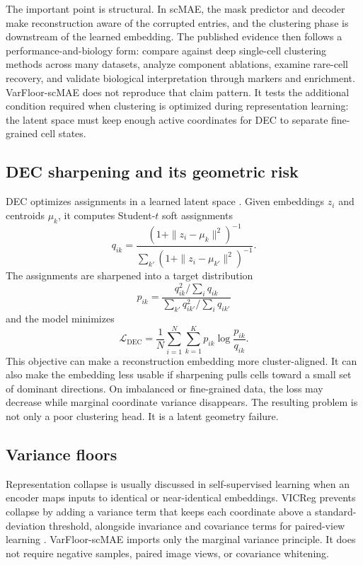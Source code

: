 \documentclass[11pt]{article}
\begin{document}
The important point is structural. In scMAE, the mask predictor and decoder make reconstruction aware of the corrupted entries, and the clustering phase is downstream of the learned embedding. The published evidence then follows a performance-and-biology form: compare against deep single-cell clustering methods across many datasets, analyze component ablations, examine rare-cell recovery, and validate biological interpretation through markers and enrichment. VarFloor-scMAE does not reproduce that claim pattern. It tests the additional condition required when clustering is optimized during representation learning: the latent space must keep enough active coordinates for DEC to separate fine-grained cell states.

\subsection{DEC sharpening and its geometric risk}

DEC optimizes assignments in a learned latent space \citep{xie2016dec}. Given embeddings $z_i$ and centroids $\mu_k$, it computes Student-$t$ soft assignments
\begin{equation}
q_{ik} =
\frac{(1 + \|z_i-\mu_k\|^2)^{-1}}
{\sum_{k'}(1 + \|z_i-\mu_{k'}\|^2)^{-1}}.
\end{equation}
The assignments are sharpened into a target distribution
\begin{equation}
p_{ik} =
\frac{q_{ik}^2 / \sum_i q_{ik}}
{\sum_{k'} q_{ik'}^2 / \sum_i q_{ik'}}
\end{equation}
and the model minimizes
\begin{equation}
\mathcal{L}_{\mathrm{DEC}}
= \frac{1}{N}\sum_{i=1}^{N}\sum_{k=1}^{K}
p_{ik}\log\frac{p_{ik}}{q_{ik}}.
\end{equation}
This objective can make a reconstruction embedding more cluster-aligned. It can also make the embedding less usable if sharpening pulls cells toward a small set of dominant directions. On imbalanced or fine-grained data, the loss may decrease while marginal coordinate variance disappears. The resulting problem is not only a poor clustering head. It is a latent geometry failure.

\subsection{Variance floors}

Representation collapse is usually discussed in self-supervised learning when an encoder maps inputs to identical or near-identical embeddings. VICReg prevents collapse by adding a variance term that keeps each coordinate above a standard-deviation threshold, alongside invariance and covariance terms for paired-view learning \citep{bardes2022vicreg}. VarFloor-scMAE imports only the marginal variance principle. It does not require negative samples, paired image views, or covariance whitening.
\end{document}
